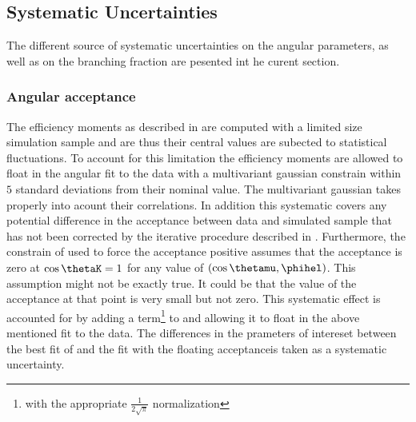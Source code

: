 \subsection{Systematic Uncertainties}
\label{systemics}
The different source of systematic uncertainties on the \Bs angular parameters, as well as on the branching fraction
are pesented int he curent section.

\subsubsection{Angular acceptance}
\label{systAngAcc}
The efficiency moments as described in  are computed with a limited size simulation sample
and are thus their central values are subected to statistical fluctuations. To account for this limitation the
efficiency moments are allowed to float in the angular fit to the data with a multivariant gaussian constrain within $5$
standard deviations from their nominal value. The multivariant gaussian takes properly into acount their correlations.
In addition this systematic covers any potential difference in the acceptance between data and simulated sample
that has not been corrected by the iterative procedure described in . Furthermore,
the constrain of  used to force the acceptance positive assumes that the acceptance is zero
at $\cos\thetaK=1$ for any value of $(\cos\thetamu,\phihel)$. This assumption might not be exactly true. It could be
that the value of the acceptance at that point is very small but not zero. This systematic effect is accounted for
by adding a term\footnote{with the appropriate $\frac{1}{2\sqrt{\pi}}$ normalization} to  and allowing it to 
float in the above mentioned fit to the data. The differences in the prameters of intereset between the best fit 
of  and the fit with the floating acceptanceis taken as a systematic uncertainty. 

